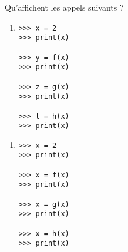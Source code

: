 \documentclass[11pt,a4paper]{article}
\begin{document}
Qu'affichent les appels suivants ?
\vspace*{2mm}

\begin{minipage}{7cm}
\begin{enumerate}
\item 

\begin{py}{3cm}
\begin{verbatim}
>>> x = 2
>>> print(x)

>>> y = f(x)
>>> print(x)

>>> z = g(x)
>>> print(x)

>>> t = h(x)
>>> print(x)
\end{verbatim}
\end{py}

\framebox[5.5cm]{$\rule{0cm}{11cm}$}
\end{enumerate}
\end{minipage}
\hfill
\begin{minipage}{7cm}
\begin{enumerate}

\item

\begin{py}{4cm}
\begin{verbatim}
>>> x = 2
>>> print(x)

>>> x = f(x)
>>> print(x)

>>> x = g(x)
>>> print(x)

>>> x = h(x)
>>> print(x)
\end{verbatim}
\end{py}

\framebox[5.5cm]{$\rule{0cm}{11cm}$}

\end{enumerate}
\end{minipage}

\end{document}
